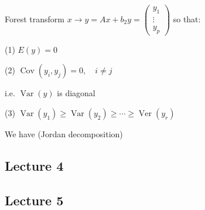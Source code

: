 Forest transform $x \rightarrow y=A x+b_{2} y=\left(\begin{array}{c}y_{1} \\ \vdots \\ y_{p}\end{array}\right)$ so that:

(1) $E(y)=0$

(2) $\operatorname{Cov}\left(y_{i}, y_{j}\right)=0, \quad i \neq j$

i.e. $\operatorname{Var}(y)$ is diagonal

(3) $\operatorname{Var}\left(y_{1}\right) \geq \operatorname{Var}\left(y_{2}\right) \geq \cdots \geq \operatorname{Ver}\left(y_{r}\right)$

We have (Jordan decomposition)






\subsection*{Lecture 4}




\subsection*{Lecture 5}
